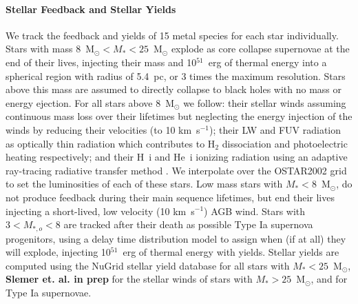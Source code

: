 \documentclass[twocolumn]{aastex61}
\begin{document}
\paragraph{Stellar Feedback and Stellar Yields} We track the feedback and yields of 15 metal species for each star individually. Stars with mass 8~M$_{\odot} < M_{*} < 25$~M$_{\odot}$ explode as core collapse supernovae at the end of their lives, injecting their mass and 10$^{51}$~erg of thermal energy into a spherical region with radius of 5.4~pc, or 3 times the maximum resolution. Stars above this mass are assumed to
    directly collapse to black holes with no mass or energy 
    ejection.
For all stars above 8~M$_{\odot}$ we follow: their stellar winds assuming continuous mass loss over their lifetimes
    but neglecting the energy injection of the winds by reducing their velocities (to 10 
    km~s$^{-1}$); 
their LW and FUV radiation as optically thin radiation which contributes to H$_2$ dissociation and photoelectric heating respectively; and their H~{\sc i} and He~{\sc i} ionizing radiation using an adaptive ray-tracing radiative transfer method \citep{WiseAbel2011}. We interpolate over the OSTAR2002 \citep{Lanz2003} grid to set the luminosities of each of these stars. Low mass stars with $M_{*} < 8$~M$_{\odot}$, do not produce feedback during their main sequence lifetimes, but end their lives injecting a short-lived, low velocity (10 km~s$^{-1}$) AGB wind. Stars with $3 < M_{*,o} < 8$ are tracked after their death as possible Type Ia supernova progenitors, using a delay time distribution model to assign when (if at all) they will explode, injecting 10$^{51}$~erg of thermal energy with yields. Stellar yields are computed using the NuGrid stellar yield database \citep{Ritter2017} for all stars with $M_{*} < 25$~M$_{\odot}$, \textbf{Slemer et. al. in prep} for the stellar winds of stars with $M_{*} > 25$~M$_{\odot}$, and \cite{Thielemann1986} for Type Ia supernovae.
\end{document}
